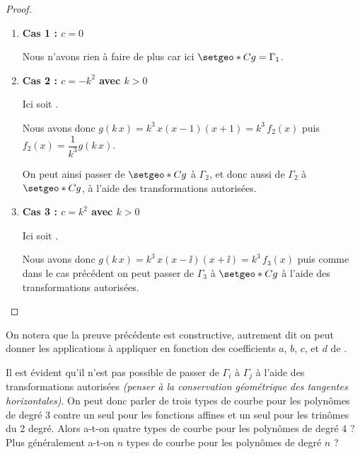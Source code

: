 \begin{proof}
\begin{enumerate}


		\item \textbf{Cas 1 : $c = 0$}

		      \smallskip

		      \noindent
		      Nous n'avons rien à faire de plus car ici $\setgeo*{C}{g} = \Gamma_1$.




		\item \textbf{Cas 2 : $c = - k^2$ avec $k > 0$}

		      \smallskip

		      \noindent
		      Ici
		      soit
		      .

		      \smallskip

		      \noindent
		      Nous avons donc $g(k \, x) = k^3 \, x(x - 1)(x + 1) = k^3 \, f_2(x)$
		      puis
		      $f_2(x) = \dfrac{1}{k^3} g(k \, x)$.

		      \smallskip

		      \noindent
		      On peut ainsi passer de $\setgeo*{C}{g}$ à $\Gamma_2$, et donc aussi de $\Gamma_2$ à $\setgeo*{C}{g}$, à l'aide des transformations autorisées.




		\item \textbf{Cas 3 : $c = k^2$ avec $k > 0$}

		      \smallskip

		      \noindent
		      Ici
		      soit
		      .

		      \smallskip

		      \noindent
		      Nous avons donc $g(k \, x) = k^3 \, x(x - \ii)(x + \ii) = k^3 \, f_3(x)$
		      puis comme dans le cas précédent on peut passer de $\Gamma_3$ à $\setgeo*{C}{g}$ à l'aide des transformations autorisées.
	\end{enumerate}
\end{proof}




On notera que la preuve précédente est constructive, autrement dit on peut donner les applications à appliquer en fonction des coefficients $a$, $b$, $c$, et $d$ de .




\medskip

Il est évident qu'il n'est pas possible de passer de $\Gamma_i$  à $\Gamma_j$ à l'aide des transformations autorisées \emph{(penser à la conservation géométrique des tangentes horizontales)}.
On peut donc parler de trois types de courbe pour les polynômes de degré 3 contre un seul pour les fonctions affines et un seul pour les trinômes du 2\ieme{} degré.
Alors a-t-on quatre types de courbe pour les polynômes de degré 4 ?
Plus généralement a-t-on $n$ types de courbe pour les polynômes de degré $n$ ?